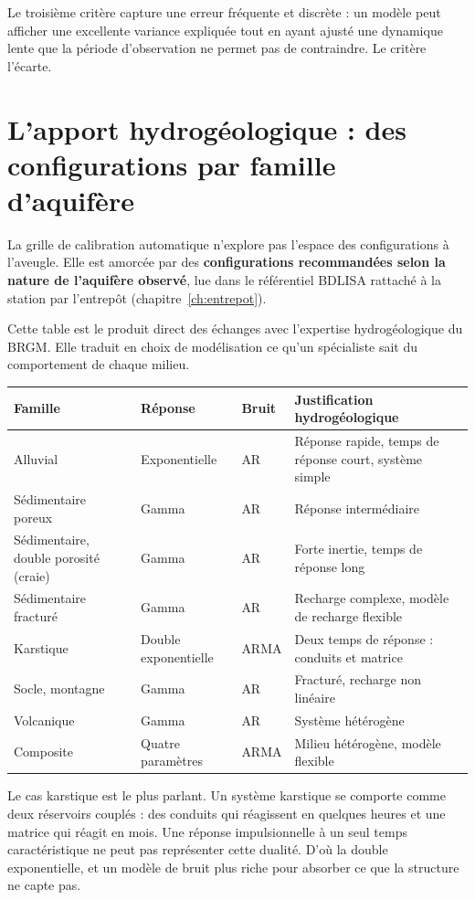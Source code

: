 Le troisième critère capture une erreur fréquente et discrète :
un modèle peut afficher une excellente variance expliquée tout en ayant ajusté une dynamique
lente que la période d'observation ne permet pas de contraindre. Le critère l'écarte.

\section{L'apport hydrogéologique : des configurations par famille d'aquifère}

La grille de calibration automatique n'explore pas l'espace des configurations à l'aveugle. Elle
est amorcée par des \textbf{configurations recommandées selon la nature de l'aquifère observé},
lue dans le référentiel BDLISA rattaché à la station par l'entrepôt (chapitre~\ref{ch:entrepot}).

Cette table est le produit direct des échanges avec l'expertise hydrogéologique du BRGM. Elle
traduit en choix de modélisation ce qu'un spécialiste sait du comportement de chaque milieu.

\begin{center}
\begin{tabularx}{\textwidth}{@{}lllX@{}}
\toprule
\textbf{Famille} & \textbf{Réponse} & \textbf{Bruit} & \textbf{Justification hydrogéologique} \\
\midrule
Alluvial & Exponentielle & AR & Réponse rapide, temps de réponse court, système simple \\
Sédimentaire poreux & Gamma & AR & Réponse intermédiaire \\
Sédimentaire, double porosité (craie) & Gamma & AR & Forte inertie, temps de réponse long \\
Sédimentaire fracturé & Gamma & AR & Recharge complexe, modèle de recharge flexible \\
Karstique & Double exponentielle & ARMA & Deux temps de réponse : conduits et matrice \\
Socle, montagne & Gamma & AR & Fracturé, recharge non linéaire \\
Volcanique & Gamma & AR & Système hétérogène \\
Composite & Quatre paramètres & ARMA & Milieu hétérogène, modèle flexible \\
\bottomrule
\end{tabularx}
\end{center}

Le cas karstique est le plus parlant. Un système karstique se comporte comme deux réservoirs
couplés : des conduits qui réagissent en quelques heures et une matrice qui réagit en mois. Une
réponse impulsionnelle à un seul temps caractéristique ne peut pas représenter cette dualité.
D'où la double exponentielle, et un modèle de bruit plus riche pour absorber ce que la
structure ne capte pas.

